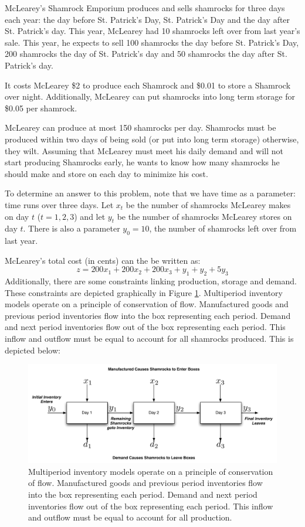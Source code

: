 \begin{example} McLearey's Shamrock Emporium produces and sells shamrocks for three days each year: the day before St. Patrick's Day, St. Patrick's Day and the day after St. Patrick's day. This year, McLearey had 10 shamrocks left over from last year's sale. This year, he expects to sell 100 shamrocks the day before St. Patrick's Day, 200 shamrocks the day of St. Patrick's day and 50 shamrocks the day after St. Patrick's day. 

It costs McLearey \$2 to produce each Shamrock and \$0.01 to store a Shamrock over night. Additionally, McLearey can put shamrocks into long term storage for \$0.05 per shamrock.

McLearey can produce at most 150 shamrocks per day. Shamrocks must be produced within two days of being sold (or put into long term storage) otherwise, they wilt. Assuming that McLearey must meet his daily demand and will not start producing Shamrocks early, he wants to know how many shamrocks he should make and store on each day to minimize his cost.

To determine an answer to this problem, note that we have time as a parameter: time runs over three days. Let $x_t$ be the number of shamrocks McLearey makes on day $t$ ($t=1,2,3$) and let $y_t$ be the number of shamrocks McLearey stores on day $t$. There is also a parameter $y_0 = 10$, the number of shamrocks left over from last year. 

McLearey's total cost (in cents) can the be written as:
\begin{equation}
z = 200x_1 + 200x_2 + 200x_3 + y_1 + y_2 + 5y_3
\end{equation} 
Additionally, there are some constraints linking production, storage and demand. These constraints are depicted graphically in Figure \ref{fig:Shamrock}. Multiperiod inventory models operate on a principle of conservation of flow. Manufactured goods and previous period inventories flow into the box representing each period. Demand and next period inventories flow out of the box representing each period. This inflow and outflow must be equal to account for all shamrocks produced. This is depicted below:
\begin{figure}[htbp]
\centering
\includegraphics[scale=0.35]{ShamrockFigure.pdf}
\caption{Multiperiod inventory models operate on a principle of conservation of flow. Manufactured goods and previous period inventories flow into the box representing each period. Demand and next period inventories flow out of the box representing each period. This inflow and outflow must be equal to account for all production.}
\label{fig:Shamrock}
\end{figure}


\end{example}

